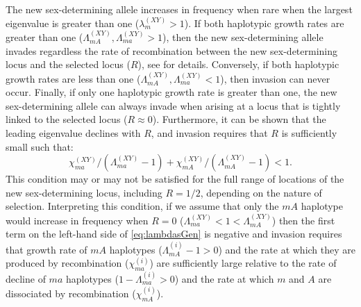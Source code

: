 \documentclass[10pt,letterpaper]{article}
\begin{document}
The new sex-determining allele increases in frequency when rare when the largest eigenvalue is greater than one ($\lambda_m^{(XY)}>1$). 
If both haplotypic growth rates are greater than one ($\Lambda_{mA}^{(XY)}, \Lambda_{ma}^{(XY)}>1$), then the new sex-determining allele invades regardless the rate of recombination between the new sex-determining locus and the selected locus ($R$), see  for details.
Conversely, if both haplotypic growth rates are less than one ($\Lambda_{mA}^{(XY)}, \Lambda_{ma}^{(XY)}<1$), then invasion can never occur.  
Finally, if only one haplotypic growth rate is greater than one, the new sex-determining allele can always invade when arising at a locus that is tightly linked to the selected locus ($R\approx0$).  
Furthermore, it can be shown that the leading eigenvalue declines with $R$, and invasion requires that $R$ is sufficiently small such that: 
\begin{equation}\label{eq:lambdasGen}
\chi_{ma}^{(XY)}/\left(\Lambda_{ma}^{(XY)} - 1\right) + \chi_{mA}^{(XY)}/\left(\Lambda_{mA}^{(XY)} - 1\right) < 1.
\end{equation}
\noindent 
This condition may or may not be satisfied for the full range of locations of the new sex-determining locus, including $R=1/2$, depending on the nature of selection.  
Interpreting this condition, if we assume that only the $mA$ haplotype would increase in frequency when $R=0$ ($\Lambda_{ma}^{(XY)}<1<\Lambda_{mA}^{(XY)}$) then the first term on the left-hand side of \eqref{eq:lambdasGen} is negative and invasion requires that growth rate of $mA$ haplotypes ($\Lambda_{mA}^{(i)}-1>0$) and the rate at which they are produced by recombination ($\chi_{ma}^{(i)}$) are sufficiently large relative to the rate of decline of $ma$ haplotypes ($1-\Lambda_{ma}^{(i)}>0$) and the rate at which $m$ and $A$ are dissociated by recombination ($\chi_{mA}^{(i)}$).
\end{document}

